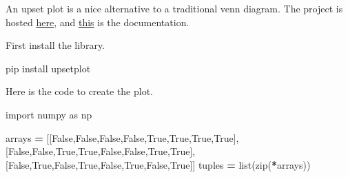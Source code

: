 \documentclass[]{book}
\newenvironment{Shaded}{\begin{snugshade}}{\end{snugshade}}
\newcommand{\BuiltInTok}[1]{#1}
\newcommand{\ExtensionTok}[1]{#1}
\newcommand{\ImportTok}[1]{#1}
\newcommand{\NormalTok}[1]{#1}
\newcommand{\OperatorTok}[1]{\textcolor[rgb]{0.81,0.36,0.00}{\textbf{#1}}}
\newcommand{\VariableTok}[1]{\textcolor[rgb]{0.00,0.00,0.00}{#1}}
\begin{document}
An upset plot is a nice alternative to a traditional venn diagram. The project is hosted \href{https://pypi.org/project/UpSetPlot/}{here}, and \href{https://buildmedia.readthedocs.org/media/pdf/upsetplot/latest/upsetplot.pdf}{this} is the documentation.

First install the library.

\begin{Shaded}
\begin{Highlighting}[]
\ExtensionTok{pip}\NormalTok{ install upsetplot}
\end{Highlighting}
\end{Shaded}

Here is the code to create the plot.

\begin{Shaded}
\begin{Highlighting}[]
\ImportTok{import}\NormalTok{ numpy }\ImportTok{as}\NormalTok{ np}

\NormalTok{arrays }\OperatorTok{=}\NormalTok{ [[}\VariableTok{False}\NormalTok{,}\VariableTok{False}\NormalTok{,}\VariableTok{False}\NormalTok{,}\VariableTok{False}\NormalTok{,}\VariableTok{True}\NormalTok{,}\VariableTok{True}\NormalTok{,}\VariableTok{True}\NormalTok{,}\VariableTok{True}\NormalTok{],}
\NormalTok{          [}\VariableTok{False}\NormalTok{,}\VariableTok{False}\NormalTok{,}\VariableTok{True}\NormalTok{,}\VariableTok{True}\NormalTok{,}\VariableTok{False}\NormalTok{,}\VariableTok{False}\NormalTok{,}\VariableTok{True}\NormalTok{,}\VariableTok{True}\NormalTok{],}
\NormalTok{          [}\VariableTok{False}\NormalTok{,}\VariableTok{True}\NormalTok{,}\VariableTok{False}\NormalTok{,}\VariableTok{True}\NormalTok{,}\VariableTok{False}\NormalTok{,}\VariableTok{True}\NormalTok{,}\VariableTok{False}\NormalTok{,}\VariableTok{True}\NormalTok{]]}
\NormalTok{tuples }\OperatorTok{=} \BuiltInTok{list}\NormalTok{(}\BuiltInTok{zip}\NormalTok{(}\OperatorTok{*}\NormalTok{arrays))}


\end{Highlighting}
\end{Shaded}
\end{document}
